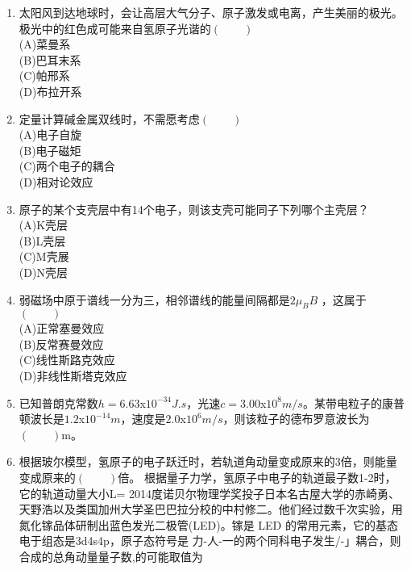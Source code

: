 \begin{enumerate}
(A)强度\\
(B)波长\\
(C)偏振方向\\
(D)照射时间
\item 太阳风到达地球时，会让高层大气分子、原子激发或电离，产生美丽的极光。极光中的红色成可能来自氢原子光谐的$(\qquad)$\\
(A)菜曼系\\
(B)巴耳末系\\
(C)帕邢系\\
(D)布拉开系
\item 定量计算碱金属双线时，不需愿考虑$(\qquad)$\\
(A)电子自旋\\
(B)电子磁矩\\
(C)两个电子的耦合\\
(D)相对论效应
\item 原子的某个支壳层中有14个电子，则该支壳可能同子下列哪个主壳层？\\
(A)K壳层\\
(B)L壳层\\
(C)M壳展\\
(D)N壳层
\item 弱磁场中原于谱线一分为三，相邻谱线的能量间隔都是$2\mu_B B$ ，这属于$(\qquad)$\\
(A)正常塞曼效应\\
(B)反常赛曼效应 \\
(C)线性斯路克效应 \\
(D)非线性斯塔克效应
\item 已知普朗克常数$h=6.63$x$10^{-34}J.s$，光速$c=3.00$x$10^8 m/s$。某带电粒子的康普顿波长是$1.2$x$10^{-14}m$，速度是$2.0$x$10^6 m/s$，则该粒子的德布罗意波长为$(\qquad)$m。
\item 根据玻尔模型，氢原子的电子跃迁时，若轨道角动量变成原来的3倍，则能量变成原来的$(\qquad)$倍。
根据量子力学，氢原子中电子的轨道最子数1-2时，它的轨道动量大小L=
2014度诺贝尔物理学奖投子日本名古屋大学的赤崎勇、天野浩以及类国加州大学圣巴巴拉分校的中村修二。他们经过数千次实验，用氮化镓品体研制出蓝色发光二极管(LED)。镓是 LED 的常用元素，它的基态电于组态是3d4s4p，原子态符号是
力-人-一的两个同科电子发生/-」耦合，则合成的总角动量量子数,的可能取值为
\end{enumerate}

